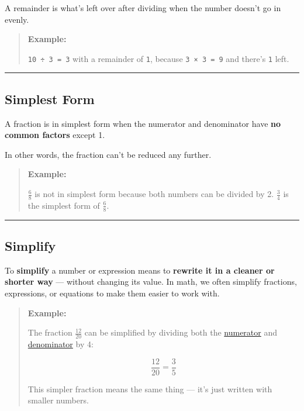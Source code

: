 \documentclass[
  letterpaper,
  DIV=11,
  numbers=noendperiod]{scrreprt}
\begin{document}
A remainder is what's left over after dividing when the number doesn't
go in evenly.

\begin{quote}
\textbf{Example:}

\texttt{10\ ÷\ 3\ =\ 3} with a remainder of \texttt{1}, because
\texttt{3\ ×\ 3\ =\ 9} and there's \texttt{1} left.
\end{quote}

\begin{center}\rule{0.5\linewidth}{0.5pt}\end{center}

\subsection*{Simplest Form}\label{glossary-simplest-form}

A fraction is in simplest form when the numerator and denominator have
\textbf{no common factors} except 1.

In other words, the fraction can't be reduced any further.

\begin{quote}
\textbf{Example:}

\(\frac{6}{8}\) is not in simplest form because both numbers can be
divided by 2. \(\frac{3}{4}\) is the simplest form of \(\frac{6}{8}\).
\end{quote}

\begin{center}\rule{0.5\linewidth}{0.5pt}\end{center}

\subsection*{Simplify}\label{glossary-simplify}

To \textbf{simplify} a number or expression means to \textbf{rewrite it
in a cleaner or shorter way} --- without changing its value. In math, we
often simplify fractions, expressions, or equations to make them easier
to work with.

\begin{quote}
\textbf{Example:}

The fraction \(\frac{12}{20}\) can be simplified by dividing both the
\href{./glossary.html\#glossary-numerator}{numerator} and
\href{./glossary.html\#glossary-denominator}{denominator} by 4:

\[\frac{12}{20} = \frac{3}{5}\]

This simpler fraction means the same thing --- it's just written with
smaller numbers.
\end{quote}
\end{document}
